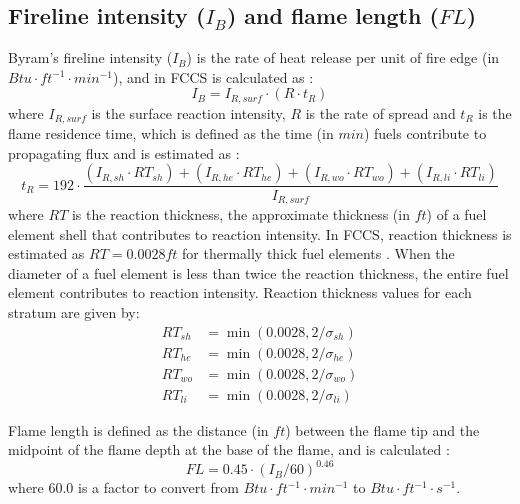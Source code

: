 \documentclass[]{book}
\begin{document}
\hypertarget{fireline-intensity-i_b-and-flame-length-fl}{%
\subsection{\texorpdfstring{Fireline intensity (\(I_B\)) and flame length (\(FL\))}{Fireline intensity (I\_B) and flame length (FL)}}\label{fireline-intensity-i_b-and-flame-length-fl}}

Byram's fireline intensity (\(I_B\)) is the rate of heat release per unit of fire edge (in \(Btu\cdot ft^{-1} \cdot min^{-1}\)), and in FCCS is calculated as \citep{Albini1976}:
\begin{equation}
I_B = I_{R,surf} \cdot (R \cdot t_R)
\end{equation}
where \(I_{R,surf}\) is the surface reaction intensity, \(R\) is the rate of spread and \(t_R\) is the flame residence time, which is defined as the time (in \(min\)) fuels contribute to propagating flux and is estimated as \citet{Albini1976}:
\begin{equation}
t_R = 192 \cdot \frac{(I_{R,sh}\cdot RT_{sh})+(I_{R,he}\cdot RT_{he})+(I_{R,wo}\cdot RT_{wo})+(I_{R,li}\cdot RT_{li})}{I_{R,surf}}
\end{equation}
where \(RT\) is the reaction thickness, the approximate thickness (in \(ft\)) of a fuel element shell that contributes to reaction intensity. In FCCS, reaction thickness is estimated as \(RT = 0.0028 ft\) for thermally thick fuel elements \citep{Sandberg2007}. When the diameter of a fuel element is less than twice the reaction thickness, the entire fuel element contributes to reaction intensity. Reaction thickness values for each stratum are given by:
\begin{eqnarray}
RT_{sh} &= \min(0.0028, 2/\sigma_{sh})\\
RT_{he} &= \min(0.0028, 2/\sigma_{he})\\
RT_{wo} &= \min(0.0028, 2/\sigma_{wo})\\
RT_{li} &= \min(0.0028, 2/\sigma_{li})
\end{eqnarray}

Flame length is defined as the distance (in \(ft\)) between the flame tip and the midpoint of the flame depth at the base of the flame, and is calculated \citep{Byram1959}:
\begin{equation}
FL = 0.45 \cdot (I_B/60)^{0.46}
\end{equation}
where 60.0 is a factor to convert from \(Btu\cdot ft^{-1} \cdot min^{-1}\) to \(Btu\cdot ft^{-1} \cdot s^{-1}\).
\end{document}
